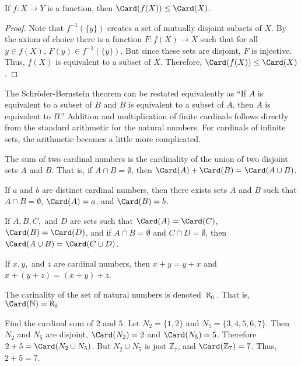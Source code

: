     \begin{theorem}
        If $f:{X}\rightarrow{Y}$ is a function,
        then $\Card(f(X))\leq\Card(X)$.
    \end{theorem}
    \begin{proof}
        Note that $f^{-1}(\{y\})$ creates a set of mutually disjoint
        subsets of $X$. By the axiom of choice there is a function
        $F:{f(X)}\rightarrow{X}$ such that for all ${y}\in{f(X)}$,
        ${F(y)}\in{f^{-1}(\{y\})}$. But since these sets are disjoint,
        $F$ is injective. Thus, $f(X)$ is equivalent to a subset of $X$.
        Therefore, $\Card(f(X))\leq\Card(X)$.
    \end{proof}
    The Schr\"{o}der-Bernstein theorem can be restated equivalently as
    ``If $A$ is equivalent to a subset of $B$ and $B$ is equivalent to a
    subset of $A$, then $A$ is equivalent to $B$.'' Addition and
    multiplication of finite cardinals follows directly from the standard
    arithmetic for the natural numbers. For cardinals of infinite sets,
    the arithmetic becomes a little more complicated.
    \begin{definition}
        The sum of two cardinal numbers is the
        cardinality of the union of two disjoint sets $A$
        and $B$. That is, if ${A}\cap{B}=\emptyset$, then
        $\Card(A)+\Card(B)=\Card({A}\cup{B})$.
    \end{definition}
    \begin{theorem}
        If $a$ and $b$ are distinct cardinal numbers, then there exists
        sets $A$ and $B$ such that ${A}\cap{B}=\emptyset$, $\Card(A)=a$,
        and $\Card(B)=b$.
    \end{theorem}
    \begin{theorem}
        If $A,B,C,$ and $D$ are sets such that $\Card(A)=\Card(C)$,
        $\Card(B)=\Card(D)$, and if ${A}\cap{B}=\emptyset$ and
        ${C}\cap{D}=\emptyset$, then
        $\Card({A}\cup{B})=\Card({C}\cup{D})$.
    \end{theorem}
    \begin{theorem}
        If $x,y,$ and $z$ are cardinal numbers, then
        $x+y=y+x$ and $x+(y+z)=(x+y)+z$.
    \end{theorem}
    The carinality of the set of natural numbers is denoted $\aleph_{0}$.
    That is, $\Card(\mathbb{N})=\aleph_{0}$
    \begin{example}
        Find the cardinal sum of $2$ and $5$. Let
        $N_{2}=\{1,2\}$ and $N_{5}=\{3,4,5,6,7\}$.
        Then $N_{2}$ and $N_{5}$ are disjoint,
        $\Card(N_{2})=2$ and $\Card(N_{5})=5$.
        Therefore $2+5=\Card(N_{2}\cup{N_{5}})$.
        But ${N_{2}}\cup{N_{5}}$ is just $\mathbb{Z}_{7}$,
        and $\Card(\mathbb{Z}_{7})=7$. Thus, $2+5=7$.
    \end{example}
